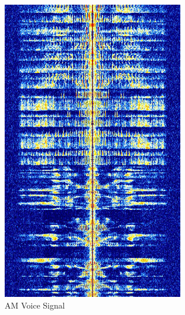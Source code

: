 \begin{figure}[h]
    \centering
    \begin{subfigure}[b]{0.2\textwidth}
        \centering
        \includegraphics[width=\textwidth]{assets/osi/physical/signals/am_voice.png}
        \caption{AM Voice Signal}
        \label{fig:am_voice}
    \end{subfigure}
    \hspace{1em}
    \begin{subfigure}[b]{0.2\textwidth}
        \centering

\end{subfigure}
\end{figure}
